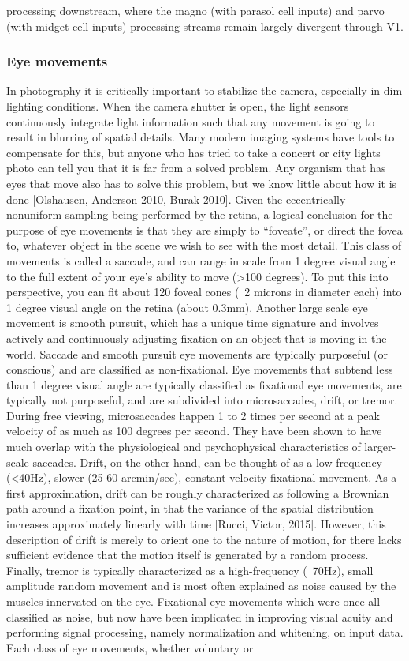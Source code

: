 processing downstream, where the magno (with parasol cell inputs) and parvo (with midget cell inputs) processing streams remain largely divergent through V1.


\subsubsection{Eye movements} In photography it is critically important to stabilize the camera, especially in dim lighting conditions. When the camera shutter is open, the light sensors continuously integrate light information such that any movement is going to result in blurring of spatial details. Many modern imaging systems have tools to compensate for this, but anyone who has tried to take a concert or city lights photo can tell you that it is far from a solved problem. Any organism that has eyes that move also has to solve this problem, but we know little about how it is done [Olshausen, Anderson 2010, Burak 2010]. Given the eccentrically nonuniform sampling being performed by the retina, a logical conclusion for the purpose of eye movements is that they are simply to “foveate”, or direct the fovea to, whatever object in the scene we wish to see with the most detail. This class of movements is called a saccade, and can range in scale from 1 degree visual angle to the full extent of your eye’s ability to move (>100 degrees). To put this into perspective, you can fit about 120 foveal cones (~2 microns in diameter each) into 1 degree visual angle on the retina (about 0.3mm). Another large scale eye movement is smooth pursuit, which has a unique time signature and involves actively and continuously adjusting fixation on an object that is moving in the world. Saccade and smooth pursuit eye movements are typically purposeful (or conscious) and are classified as non-fixational. Eye movements that subtend less than 1 degree visual angle are typically classified as fixational eye movements, are typically not purposeful, and are subdivided into microsaccades, drift, or tremor. During free viewing, microsaccades happen 1 to 2  times per second at a peak velocity of as much as 100 degrees per second. They have been shown to have much overlap with the physiological and psychophysical characteristics of larger-scale saccades. Drift, on the other hand, can be thought of as a low frequency (<40Hz), slower (25-60 arcmin/sec), constant-velocity fixational movement. As a first approximation, drift can be roughly characterized as following a Brownian path around a fixation point, in that the variance of the spatial distribution increases approximately linearly with time [Rucci, Victor, 2015]. However, this description of drift is merely to orient one to the nature of motion, for there lacks sufficient evidence that the motion itself is generated by a random process. Finally, tremor is typically characterized as a high-frequency (~70Hz), small amplitude random movement and is most often explained as noise caused by the muscles innervated on the eye. Fixational eye movements which were once all classified as noise, but now have been implicated in improving visual acuity and performing signal processing, namely normalization and whitening, on input data. Each class of eye movements, whether voluntary or 